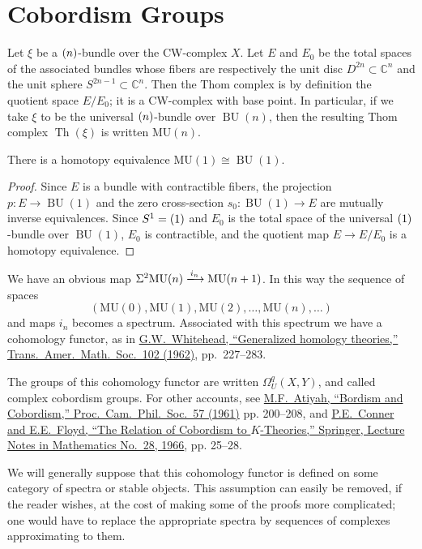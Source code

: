 \documentclass[english, oneside, letterpaper]{book}
\renewcommand{\C}{\mathbb{C}}
\DeclareMathOperator{\Th}{\mathrm{Th}}
\DeclareMathOperator{\M}{\mathrm{M}}
\let\U\relax
\DeclareMathOperator{\U}{\mathrm{U}}
\DeclareMathOperator{\BU}{\mathrm{BU}}
\newcommand{\MU}{\mathrm{MU}}
\newcommand{\nn}[2]{#2} %
\begin{document}
\section{Cobordism Groups}\label{sec:part-1-sec-2}
Let $\xi$ be a $\U(n)$-bundle over the CW-complex $X$. Let $E$ and $E_0$ be the total spaces of the associated bundles whose fibers are respectively the unit disc \nn{$E^{2n}\subset\C^n$}{$D^{2n}\subset\C^n$} and the unit sphere $S^{2n-1}\subset\C^n$. Then the Thom complex is by definition the quotient space $E/E_0$; it is a CW-complex with base point. In particular, if we take $\xi$ to be the universal $\U(n)$-bundle over $\BU(n)$, then the resulting Thom complex \nn{$\M(\xi)$}{$\Th(\xi)$} is written $\MU(n)$.
\begin{example}
    There is a homotopy equivalence \nn{$\MU(1)\sim\BU(1)$}{$\MU(1)\cong\BU(1)$}.
\end{example}
\begin{proof}
    Since $E$ is a bundle with contractible fibers, the projection $p\colon E\rightarrow\BU(1)$ and the zero cross-section $s_0\colon\BU(1)\rightarrow E$ are mutually inverse equivalences. Since $S^1=\U(1)$ and $E_0$ is the total space of the universal $\U(1)$-bundle over $\BU(1)$, $E_0$ is contractible, and the quotient map $E\rightarrow E/E_0$ is a homotopy equivalence.
\end{proof}
We have an obvious map \nn{$S^2\MU(n)\xlongrightarrow{i_n}\MU(n+1)$}{$\Sigma^2\MU(n)\xlongrightarrow{i_n}\MU(n+1)$}. In this way the sequence of spaces
\[(\MU(0),\MU(1),\MU(2),\ldots,\MU(n),\ldots)\]
and maps $i_n$ becomes a spectrum. Associated with this spectrum we have a cohomology functor, as in \href{https://www.jstor.org/stable/1993676?seq=1#metadata_info_tab_contents}{G.W.\ Whitehead, ``Generalized homology theories,'' Trans.\ Amer.\ Math.\ Soc.\ 102 (1962)}, pp.\ 227--283.

The groups of this cohomology functor are written $\Omega^q_U(X,Y)$, and called complex cobordism groups. For other accounts, see \href{https://www.maths.ed.ac.uk/~v1ranick/papers/atiyahb.pdf}{M.F.\ Atiyah, ``Bordism and Cobordism,'' Proc.\ Cam.\ Phil.\ Soc.\ 57 (1961)} pp. 200--208, and \href{https://www.springer.com/gp/book/9783540036104}{P.E.\ Conner and E.E.\ Floyd, ``The Relation of Cobordism to $K$-Theories,'' Springer, Lecture Notes in Mathematics No.\ 28, 1966}, pp. 25--28.

We will generally suppose that this cohomology functor is defined on some category of spectra or stable objects. This assumption can easily be removed, if the reader wishes, at the cost of making some of the proofs more complicated; one would have to replace the appropriate spectra by sequences of complexes approximating to them.
\end{document}
